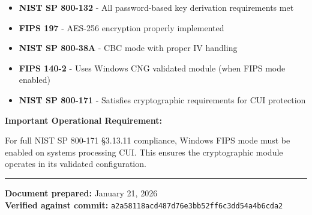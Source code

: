 \documentclass[11pt,letterpaper]{article}
\begin{document}
\begin{itemize}
    \item \textbf{NIST SP 800-132} - All password-based key derivation requirements met
    \item \textbf{FIPS 197} - AES-256 encryption properly implemented
    \item \textbf{NIST SP 800-38A} - CBC mode with proper IV handling
    \item \textbf{FIPS 140-2} - Uses Windows CNG validated module (when FIPS mode enabled)
    \item \textbf{NIST SP 800-171} - Satisfies cryptographic requirements for CUI protection
\end{itemize}

\textbf{Important Operational Requirement:}

For full NIST SP 800-171 \S3.13.11 compliance, Windows FIPS mode must be enabled on systems processing CUI. This ensures the cryptographic module operates in its validated configuration.

\vspace{24pt}

\noindent\rule{\textwidth}{0.5pt}

\textbf{Document prepared:} January 21, 2026 \\
\textbf{Verified against commit:} \texttt{a2a58118acd487d76e3bb52ff6c3dd54a4b6cda2}
\end{document}
